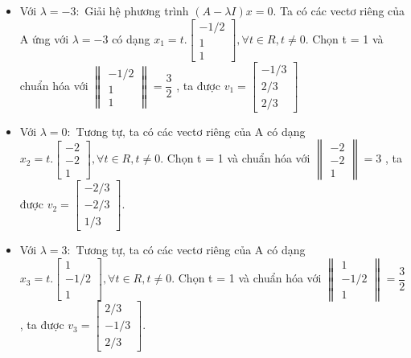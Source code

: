 \documentclass{article}
\begin{document}
\begin{itemize}
    \item Với \( \lambda = -3: \)
          \newline Giải hệ phương trình \( (A - \lambda I)x = 0 \).
          Ta có các vectơ riêng của A ứng với \( \lambda = -3\) có dạng
          \( x_1 = t.\begin{bmatrix} -1/2 \\ 1 \\ 1 \end{bmatrix}
          ,\forall t \in R, t \neq 0. \)
          \newline Chọn t = 1 và chuẩn hóa với \( \begin{Vmatrix} -1/2 \\ 1 \\ 1 \end{Vmatrix}
          = \dfrac{3}{2} \) , ta được
          \(v_1 = \begin{bmatrix} -1/3 \\ 2/3 \\ 2/3 \end{bmatrix}\)
    \item Với \( \lambda = 0: \)
          \newline Tương tự, ta có các vectơ riêng của A có dạng
          \( x_2 = t.\begin{bmatrix}
              -2 \\ -2 \\ 1
          \end{bmatrix} ,\forall t \in R, t \neq 0. \)
          \newline Chọn t = 1 và chuẩn hóa với \( \begin{Vmatrix} -2 \\ -2 \\ 1 \end{Vmatrix}
          = 3 \) , ta được
          \(v_2 = \begin{bmatrix} -2/3 \\ -2/3 \\ 1/3 \end{bmatrix}\).
    \item Với \( \lambda = 3: \)
          \newline Tương tự, ta có các vectơ riêng của A có dạng
          \( x_3 = t.\begin{bmatrix}
              1 \\ -1/2 \\ 1
          \end{bmatrix} ,\forall t \in R, t \neq 0. \)
          \newline Chọn t = 1 và chuẩn hóa với \( \begin{Vmatrix} 1 \\ -1/2 \\ 1 \end{Vmatrix}
          = \dfrac{3}{2} \) , ta được
          \(v_3 = \begin{bmatrix} 2/3 \\ -1/3 \\ 2/3 \end{bmatrix}\).
\end{itemize}
\end{document}

